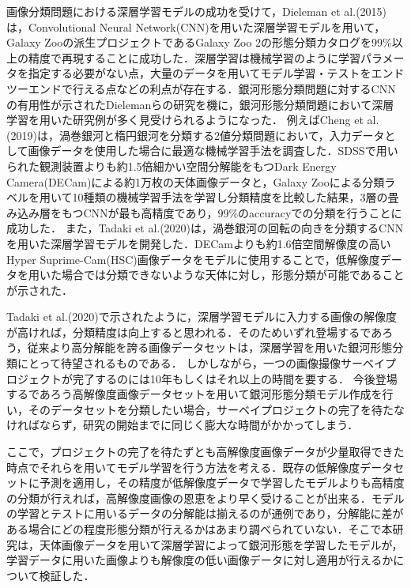 \documentclass[a4j, 11pt]{jreport}
\begin{document}
画像分類問題における深層学習モデルの成功を受けて，Dieleman et al.(2015)\cite{Dieleman2015}は，Convolutional Neural Network(CNN)を用いた深層学習モデルを用いて，Galaxy Zooの派生プロジェクトであるGalaxy Zoo 2の形態分類カタログを99\%以上の精度で再現することに成功した．深層学習は機械学習のように学習パラメータを指定する必要がない点，大量のデータを用いてモデル学習・テストをエンドツーエンドで行える点などの利点が存在する．銀河形態分類問題に対するCNNの有用性が示されたDielemanらの研究を機に，銀河形態分類問題において深層学習を用いた研究例が多く見受けられるようになった．
例えばCheng et al.(2019)\cite{Cheng2019}は，渦巻銀河と楕円銀河を分類する2値分類問題において，入力データとして画像データを使用した場合に最適な機械学習手法を調査した．SDSSで用いられた観測装置よりも約1.5倍細かい空間分解能をもつDark Energy Camera(DECam)による約1万枚の天体画像データと，Galaxy Zooによる分類ラベルを用いて10種類の機械学習手法を学習し分類精度を比較した結果，3層の畳み込み層をもつCNNが最も高精度であり，99\%のaccuracyでの分類を行うことに成功した．
また，Tadaki et al.(2020)\cite{Tadaki2020}は，渦巻銀河の回転の向きを分類するCNNを用いた深層学習モデルを開発した．DECamよりも約1.6倍空間解像度の高いHyper Suprime-Cam(HSC)画像データをモデルに使用することで，低解像度データを用いた場合では分類できないような天体に対し，形態分類が可能であることが示された．

Tadaki et al.(2020)で示されたように，深層学習モデルに入力する画像の解像度が高ければ，分類精度は向上すると思われる．そのためいずれ登場するであろう，従来より高分解能を誇る画像データセットは，深層学習を用いた銀河形態分類にとって待望されるものである．
しかしながら，一つの画像撮像サーベイプロジェクトが完了するのには10年もしくはそれ以上の時間を要する．
今後登場するであろう高解像度画像データセットを用いて銀河形態分類モデル作成を行い，そのデータセットを分類したい場合，サーベイプロジェクトの完了を待たなければならず，研究の開始までに同じく膨大な時間がかかってしまう．


ここで，プロジェクトの完了を待たずとも高解像度画像データが少量取得できた時点でそれらを用いてモデル学習を行う方法を考える．既存の低解像度データセットに予測を適用し，その精度が低解像度データで学習したモデルよりも高精度の分類が行えれば，高解像度画像の恩恵をより早く受けることが出来る．モデルの学習とテストに用いるデータの分解能は揃えるのが通例であり，分解能に差がある場合にどの程度形態分類が行えるかはあまり調べられていない．そこで本研究は，天体画像データを用いて深層学習によって銀河形態を学習したモデルが，学習データに用いた画像よりも解像度の低い画像データに対し適用が行えるかについて検証した．
\end{document}
